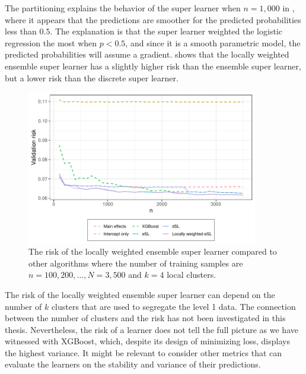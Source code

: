 \documentclass[./main.tex]{subfiles}
\begin{document}
The partitioning explains the behavior of the super learner when $ n = 1,000 $ in , where it appears that the predictions are smoother for the predicted probabilities less than $ 0.5 $. The explanation is that the super learner weighted the logistic regression the most when $ p < 0.5 $, and since it is a smooth parametric model, the predicted probabilities will assume a gradient. 
 shows that the locally weighted ensemble super learner has a slightly higher risk than the ensemble super learner, but a lower risk than the discrete super learner. 
\begin{figure}[H]
    \centering
    \includegraphics[width=0.9\textwidth]{figures/losses_esl_lw_s22.pdf}
    \caption{The risk of the locally weighted ensemble super learner compared to other algorithms where the number of training samples are $ n = 100, 200, \dots , N = 3,500 $ and $ k = 4 $ local clusters.}
    \label{fig:losses_esl_lw}
\end{figure}
The risk of the locally weighted ensemble super learner can depend on the number of $ k $ clusters that are used to segregate the level 1 data. The connection between the number of clusters and the risk has not been investigated in this thesis. Nevertheless, the risk of a learner does not tell the full picture as we have witnessed with XGBoost, which, despite its design of minimizing loss, displays the highest variance. It might be relevant to consider other metrics that can evaluate the learners on the stability and variance of their predictions. 
\end{document}
